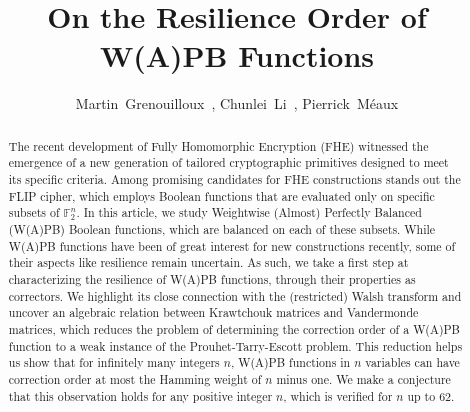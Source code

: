 \documentclass[11pt]{llncs}
\begin{document}
\title{On the Resilience Order of W(A)PB Functions}





	\author{
			\mbox{Martin Grenouilloux },
			\mbox{Chunlei Li },
		\mbox{Pierrick M\'eaux}
	}








	\maketitle



 \setcounter{page}{1}

\begin{abstract}
The recent development of Fully Homomorphic Encryption (FHE)
witnessed the emergence of a new generation of tailored cryptographic primitives
designed to meet its specific criteria. Among promising candidates for FHE
constructions stands out the FLIP cipher, which employs Boolean functions that
are evaluated only on specific subsets of $\mathbb{F}_2^n$.
In this article, we study Weightwise (Almost) Perfectly Balanced (W(A)PB) Boolean functions, which are balanced on each of these subsets. While W(A)PB functions have been of great
interest for new constructions recently, some of their aspects like resilience
remain uncertain. As such, we take a first step at characterizing the resilience
of W(A)PB functions, through their properties as correctors. We highlight its
close connection with the (restricted) Walsh transform and uncover an algebraic
relation between Krawtchouk matrices and Vandermonde matrices, which
reduces the problem of determining the correction order of a W(A)PB function to a weak
instance of the Prouhet-Tarry-Escott problem.
This reduction helps us show that
for infinitely many integers $n$, W(A)PB functions in $n$ variables can have correction order at most the Hamming weight of $n$ minus one.
We make a conjecture that this observation holds for any positive integer $n$, which is verified for $n$ up to $62$.

\end{abstract}

\end{document}

